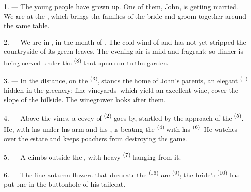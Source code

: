 
\VUsaut{4.0mm}
\VUsaut{1.6mm}
\VUsaut{3.2mm}

\VUsaut{1.6mm}
\VUsaut{2.6mm}

\VUsaut{3.0mm}

1. --- The young people have grown up. One of them, John, is getting married. We are at the
, which brings the families of the bride and groom together around
the same table.

2. --- We are in , in the month of . The cold wind of
 and  has not yet stripped the countryside of its green
leaves. The evening air is mild and fragrant; so dinner is being served under the
 \textsuperscript{(8)} that opens on to the garden.

3. --- In the distance, on the  \textsuperscript{(3)}, stands the home of John's
parents, an elegant  \textsuperscript{(1)} hidden in the greenery; fine
vineyards, which yield an excellent wine, cover the slope of the hillside. The winegrower
looks after them.

4. --- Above the vines, a covey of  \textsuperscript{(2)} goes by, startled
by the approach of the  \textsuperscript{(5)}. He, with his 
under his arm and his , is beating the
 \textsuperscript{(4)} with his  \textsuperscript{(6)}. He watches
over the estate and keeps poachers from destroying the game.

5. --- A  climbs outside the , with heavy
 \textsuperscript{(7)} hanging from it.

6. --- The fine autumn flowers that decorate the  \textsuperscript{(16)} are
 \textsuperscript{(9)}; the bride's 
\textsuperscript{(10)} has put one in the buttonhole of his tailcoat.

